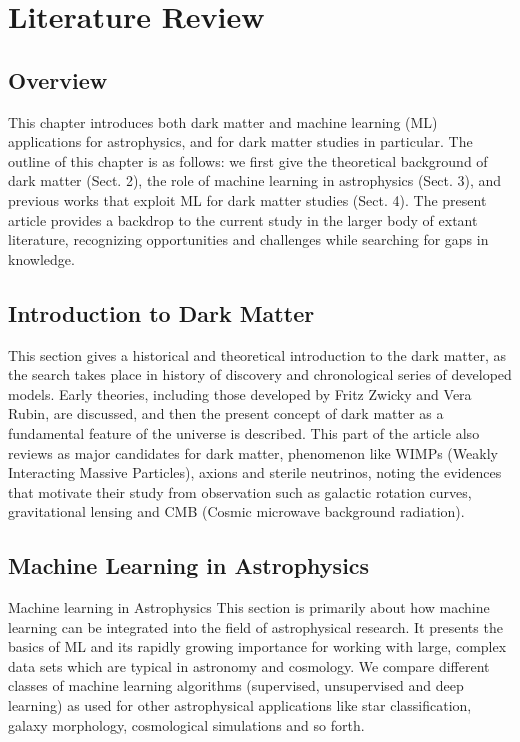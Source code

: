 
\chapter{Literature Review}
\label{chap:2}

\section{Overview} 

 This chapter introduces both dark matter and machine learning (ML) applications for astrophysics, and for dark matter studies in particular. The outline of this chapter is as follows: we first give the theoretical background of dark matter (Sect. 2), the role of machine learning in astrophysics (Sect. 3), and previous works that exploit ML for dark matter studies (Sect. 4). The present article provides a backdrop to the current study in the larger body of extant literature, recognizing opportunities and challenges while searching for gaps in knowledge.

\section{Introduction to Dark Matter}

This section gives a historical and theoretical introduction to the dark matter, as the search takes place in history of discovery and chronological series of developed models. Early theories, including those developed by Fritz Zwicky and Vera Rubin, are discussed, and then the present concept of dark matter as a fundamental feature of the universe is described. This part of the article also reviews as major candidates for dark matter, phenomenon like WIMPs (Weakly Interacting Massive Particles), axions and sterile neutrinos, noting the evidences that motivate their study from observation such as galactic rotation curves, gravitational lensing and CMB (Cosmic microwave background radiation).\cite{bertone2005,jungman1996}

\section{Machine Learning in Astrophysics} 

Machine learning in Astrophysics This section is primarily about how machine learning can be integrated into the field of astrophysical research. It presents the basics of ML and its rapidly growing importance for working with large, complex data sets which are typical in astronomy and cosmology. We compare different classes of machine learning algorithms (supervised, unsupervised and deep learning) as used for other astrophysical applications like star classification, galaxy morphology, cosmological simulations and so forth.\cite{wikiDM}

